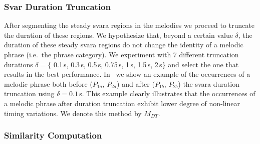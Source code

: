 \subsubsection{Svar Duration Truncation}
\label{sec:patterns_improving_similarity_svara_duration_trucation}

After segmenting the steady \gls{svara} regions in the melodies we proceed to truncate the duration of these regions. We hypothesize that, beyond a certain value $\delta$, the duration of these steady \gls{svara} regions do not change the identity of a melodic phrase (i.e.~the phrase category). We experiment with 7 different truncation durations $\delta = \lbrace$ 0.1\,s, 0.3\,s, 0.5\,s, 0.75\,s, 1\,s, 1.5\,s, 2\,s$\rbrace$ and select the one that results in the best performance. In~
we show an example of the occurrences of a melodic phrase both before ($P_{1a}$, $P_{2a}$) and after ($P_{1b}$, $P_{2b}$) the \gls{svara} duration truncation using $\delta = 0.1$\,s. This example clearly illustrates that the occurrences of a melodic phrase after duration truncation exhibit lower degree of non-linear timing variations. We denote this method by $M_{DT}$.

\subsubsection{Similarity Computation}
\label{sec:patterns_improving_similarity_similarity_computation}

